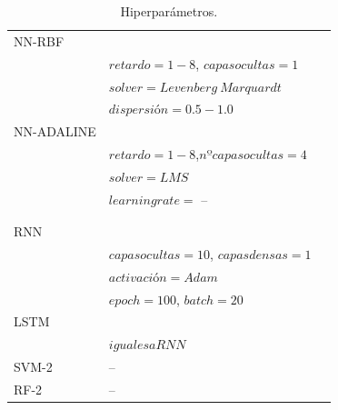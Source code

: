 \documentclass[12pt]{article}
\begin{document}
\begin{table}
\begin{tabular}{|l l l|}
NN-RBF     &&\\
    &$retardo = 1-8$, $capas ocultas = 1$&\citeauthor{Li2}\\
     &$solver = Levenberg~Marquardt$&\\
     &$dispersión = 0.5-1.0$&\\
NN-ADALINE     &&\\
    &$retardo = 1-8$,$ nº capas ocultas = 4$&\\
     &$solver = LMS$&\\
     &$learning rate =$ --&\\
     &&\\
\hline
   &&\\
RNN    &&\\
        &$capas ocultas = 10$, $capas densas = 1$&\\
        &$activación = Adam$&\\
        &$epoch = 100$, $batch = 20$&\\
LSTM      &&\\
    & $iguales a RNN$&\citeauthor{Mahsa}\\
SVM-2     & -- &\\
RF-2     & -- &\\
\hline
\end{tabular}
\caption{Hiperparámetros.}
 \label{tabla}
\end{table}
\end{document}
